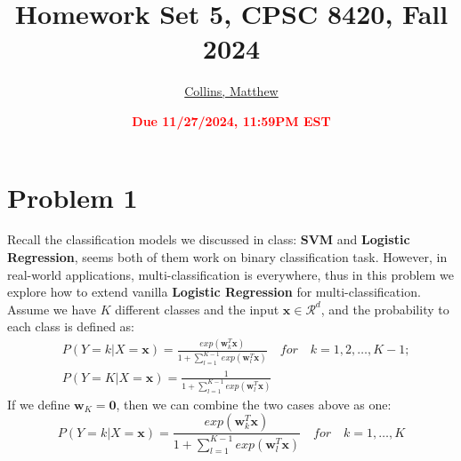 \documentclass[11pt]{article}
\title{{\bf Homework Set 5, CPSC 8420, Fall 2024}} %
\author{\Large\underline{Collins, Matthew}}
\date{\textbf{\Large\textcolor{red}{Due 11/27/2024, 11:59PM EST}}} %
\newcommand{\vct}[1]{\mathbf{#1}}
\def \vzero    {\vct{0}}
\def \vw {\vct{w}}
\def \vx {\vct{x}}
\begin{document}
\maketitle
\section*{Problem 1}
Recall the classification models we discussed in class: \textbf{SVM} and \textbf{Logistic Regression}, seems both of them work on binary classification task. However, in real-world applications, multi-classification is everywhere, thus in this problem we explore how to extend vanilla \textbf{Logistic Regression} for multi-classification. Assume we have $K$ different classes and the input $
\vx\in\mathcal{R}^d$, and the probability to each class is defined as:
\begin{equation}
	\begin{aligned}
		&P(Y=k|X=\vx) =  \frac{exp(\vw_k^T\vx)}{ 1+\sum_{l=1}^{K-1}exp(\vw_l^T\vx)} \quad for  \quad k=1,2,\dots,K-1;\\&P(Y=K|X=\vx) =  \frac{1} { 1+\sum_{l=1}^{K-1}exp(\vw_l^T\vx)}
	\end{aligned}
\end{equation}
If we define $\vw_K=\vzero$, then we can combine the two cases above as one:
\begin{equation}
	P(Y=k|X=\vx) =  \frac{exp(\vw_k^T\vx)}{ 1+\sum_{l=1}^{K-1}exp(\vw_l^T\vx)} \quad for  \quad k=1,\dots,K
\end{equation}
\end{document}
